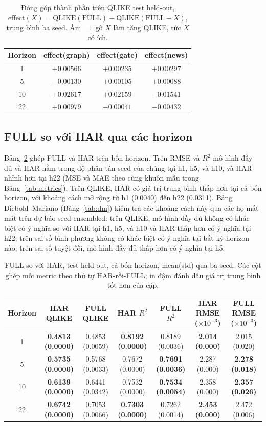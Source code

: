 \documentclass[runningheads]{llncs}
\begin{document}
\begin{table}[t]
\caption{Đóng góp thành phần trên QLIKE test held-out,
$\text{effect}(X)=\text{QLIKE}(\text{FULL})-\text{QLIKE}(\text{FULL}{-}X)$, trung bình ba seed. Âm $=$ gỡ
$X$ làm tăng QLIKE, tức $X$ có ích.}
\label{tab:effect}
\centering
\begin{tabular}{cccc}
\toprule
Horizon & effect(graph) & effect(gate) & effect(news) \\
\midrule
1  & $+0.00566$ & $+0.00235$ & $+0.00297$ \\
5  & $-0.00130$ & $+0.00105$ & $+0.00088$ \\
10 & $+0.02617$ & $+0.02159$ & $-0.01541$ \\
22 & $+0.00979$ & $-0.00041$ & $-0.00432$ \\
\bottomrule
\end{tabular}
\end{table}

\subsection{FULL so với HAR qua các horizon}
\label{sec:fullvshar}
Bảng~\ref{tab:fullvshar} ghép FULL và HAR trên bốn horizon. Trên RMSE và $R^2$ mô hình đầy đủ và HAR nằm
trong độ phân tán seed của chúng tại h1, h5, và h10, và HAR nhỉnh hơn tại h22 (MSE và MAE theo cùng khuôn
mẫu trong Bảng~\ref{tab:metrics}). Trên QLIKE, HAR có giá trị trung bình thấp hơn tại cả bốn horizon, với
khoảng cách mở rộng từ h1 (0.0040) đến h22 (0.0311). Bảng Diebold--Mariano (Bảng~\ref{tab:dm}) kiểm tra
các khoảng cách này qua các họ mất mát trên dự báo seed-ensembled: trên QLIKE, mô hình đầy đủ không có
khác biệt có ý nghĩa so với HAR tại h1, h5, và h10 và HAR thấp hơn có ý nghĩa tại h22; trên sai số bình
phương không có khác biệt có ý nghĩa tại bất kỳ horizon nào; trên sai số tuyệt đối, mô hình đầy đủ thấp
hơn có ý nghĩa tại h5.

\begin{table}[t]
\caption{FULL so với HAR, test held-out, cả bốn horizon, mean(std) qua ba seed. Các cột ghép mỗi metric
theo thứ tự HAR-rồi-FULL; in đậm đánh dấu giá trị trung bình tốt hơn của cặp.}
\label{tab:fullvshar}
\centering
\begin{tabular}{ccccccc}
\toprule
Horizon & HAR QLIKE & FULL QLIKE & HAR $R^2$ & FULL $R^2$ & HAR RMSE ($\times10^{-3}$) & FULL RMSE ($\times10^{-3}$) \\
\midrule
1  & \textbf{0.4813 (0.0000)} & 0.4853 (0.0059) & \textbf{0.8192 (0.0000)} & 0.8189 (0.0036) & \textbf{2.014 (0.000)} & 2.015 (0.020) \\
5  & \textbf{0.5735 (0.0000)} & 0.5768 (0.0033) & 0.7672 (0.0000) & \textbf{0.7691 (0.0036)} & 2.287 (0.000) & \textbf{2.278 (0.018)} \\
10 & \textbf{0.6139 (0.0000)} & 0.6441 (0.0342) & 0.7532 (0.0000) & \textbf{0.7534 (0.0054)} & 2.358 (0.000) & \textbf{2.357 (0.026)} \\
22 & \textbf{0.6742 (0.0000)} & 0.7053 (0.0066) & \textbf{0.7303 (0.0000)} & 0.7262 (0.0014) & \textbf{2.453 (0.000)} & 2.472 (0.006) \\
\bottomrule
\end{tabular}
\end{table}
\end{document}
